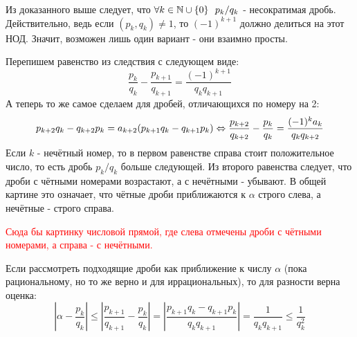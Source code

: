 \begin{corollary}
	Из доказанного выше следует, что $\forall k \in \mathbb{N} \cup \{0\}\ \ p_k/q_k$ - несократимая дробь. Действительно, ведь если $(p_k, q_k) \neq 1$, то $(-1)^{k + 1}$ должно делиться на этот НОД. Значит, возможен лишь один вариант - они взаимно просты.
\end{corollary}

\begin{note}
	Перепишем равенство из следствия с следующем виде:
	\[
		\frac{p_k}{q_k} - \frac{p_{k + 1}}{q_{k + 1}} = \frac{(-1)^{k + 1}}{q_k q_{k + 1}}
	\]
	А теперь то же самое сделаем для дробей, отличающихся по номеру на 2:
	\[
		p_{k + 2}q_k - q_{k + 2} p_k = a_{k + 2}(p_{k + 1}q_k - q_{k + 1}p_k) \Leftrightarrow \frac{p_{k + 2}}{q_{k + 2}} - \frac{p_k}{q_k} = \frac{(-1)^k a_k}{q_k q_{k + 2}}
	\]
	Если $k$ - нечётный номер, то в первом равенстве справа стоит положительное число, то есть дробь $p_k/q_k$ больше следующей. Из второго равенства следует, что дроби с чётными номерами возрастают, а с нечётными - убывают. В общей картине это означает, что чётные дроби приближаются к $\alpha$ строго слева, а нечётные - строго справа.
	
	\textcolor{red}{Сюда бы картинку числовой прямой, где слева отмечены дроби с чётными номерами, а справа - с нечётными.}
	
	Если рассмотреть подходящие дроби как приближение к числу $\alpha$ (пока рациональному, но то же верно и для иррациональных), то для разности верна оценка:
	\[
		\left|\alpha - \frac{p_k}{q_k}\right| \le \left|\frac{p_{k + 1}}{q_{k + 1}} - \frac{p_k}{q_k}\right| = \left|\frac{p_{k + 1} q_k - q_{k + 1} p_k}{q_k q_{k + 1}}\right| = \frac{1}{q_k q_{k + 1}} \le \frac{1}{q_k^2}
	\]
\end{note}